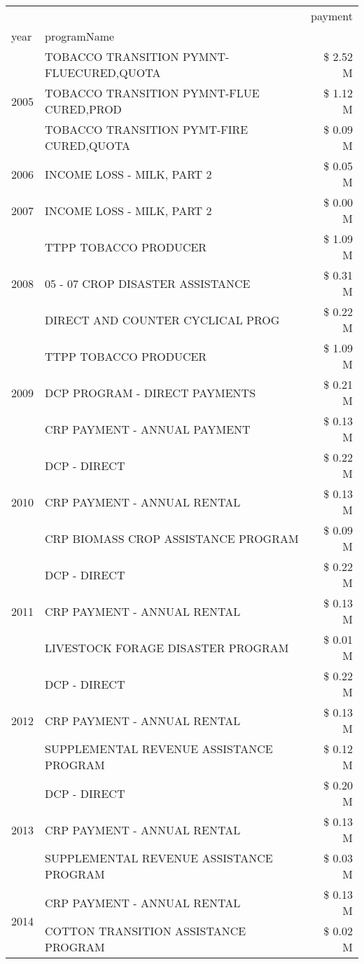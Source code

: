 \begin{tabular}{llr}
\toprule
 &  & payment \\
year & programName &  \\
\midrule
\multirow[t]{3}{*}{2005} & TOBACCO TRANSITION PYMNT-FLUECURED,QUOTA & \$ 2.52 M \\
 & TOBACCO TRANSITION PYMNT-FLUE CURED,PROD & \$ 1.12 M \\
 & TOBACCO TRANSITION PYMT-FIRE CURED,QUOTA & \$ 0.09 M \\
\cline{1-3}
2006 & INCOME LOSS - MILK, PART 2 & \$ 0.05 M \\
\cline{1-3}
2007 & INCOME LOSS - MILK, PART 2 & \$ 0.00 M \\
\cline{1-3}
\multirow[t]{3}{*}{2008} & TTPP TOBACCO PRODUCER & \$ 1.09 M \\
 & 05 - 07 CROP DISASTER ASSISTANCE & \$ 0.31 M \\
 & DIRECT AND COUNTER CYCLICAL PROG & \$ 0.22 M \\
\cline{1-3}
\multirow[t]{3}{*}{2009} & TTPP TOBACCO PRODUCER & \$ 1.09 M \\
 & DCP PROGRAM - DIRECT PAYMENTS & \$ 0.21 M \\
 & CRP PAYMENT - ANNUAL PAYMENT & \$ 0.13 M \\
\cline{1-3}
\multirow[t]{3}{*}{2010} & DCP - DIRECT & \$ 0.22 M \\
 & CRP PAYMENT - ANNUAL RENTAL & \$ 0.13 M \\
 & CRP BIOMASS CROP ASSISTANCE PROGRAM & \$ 0.09 M \\
\cline{1-3}
\multirow[t]{3}{*}{2011} & DCP - DIRECT & \$ 0.22 M \\
 & CRP PAYMENT - ANNUAL RENTAL & \$ 0.13 M \\
 & LIVESTOCK FORAGE DISASTER PROGRAM & \$ 0.01 M \\
\cline{1-3}
\multirow[t]{3}{*}{2012} & DCP - DIRECT & \$ 0.22 M \\
 & CRP PAYMENT - ANNUAL RENTAL & \$ 0.13 M \\
 & SUPPLEMENTAL REVENUE ASSISTANCE PROGRAM & \$ 0.12 M \\
\cline{1-3}
\multirow[t]{3}{*}{2013} & DCP - DIRECT & \$ 0.20 M \\
 & CRP PAYMENT - ANNUAL RENTAL & \$ 0.13 M \\
 & SUPPLEMENTAL REVENUE ASSISTANCE PROGRAM & \$ 0.03 M \\
\cline{1-3}
\multirow[t]{2}{*}{2014} & CRP PAYMENT - ANNUAL RENTAL & \$ 0.13 M \\
 & COTTON TRANSITION ASSISTANCE PROGRAM & \$ 0.02 M \\

\end{tabular}
